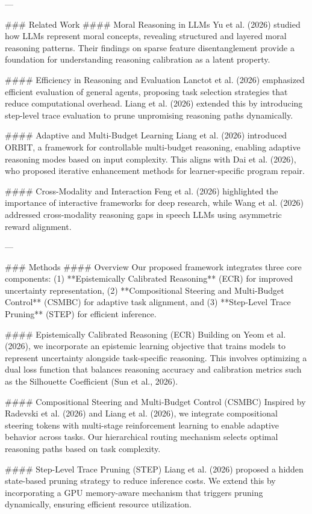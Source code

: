 ---

### Related Work
#### Moral Reasoning in LLMs
Yu et al. (2026) studied how LLMs represent moral concepts, revealing structured and layered moral reasoning patterns. Their findings on sparse feature disentanglement provide a foundation for understanding reasoning calibration as a latent property.

#### Efficiency in Reasoning and Evaluation
Lanctot et al. (2026) emphasized efficient evaluation of general agents, proposing task selection strategies that reduce computational overhead. Liang et al. (2026) extended this by introducing step-level trace evaluation to prune unpromising reasoning paths dynamically.

#### Adaptive and Multi-Budget Learning
Liang et al. (2026) introduced ORBIT, a framework for controllable multi-budget reasoning, enabling adaptive reasoning modes based on input complexity. This aligns with Dai et al. (2026), who proposed iterative enhancement methods for learner-specific program repair.

#### Cross-Modality and Interaction
Feng et al. (2026) highlighted the importance of interactive frameworks for deep research, while Wang et al. (2026) addressed cross-modality reasoning gaps in speech LLMs using asymmetric reward alignment.

---

### Methods
#### Overview
Our proposed framework integrates three core components: (1) **Epistemically Calibrated Reasoning** (ECR) for improved uncertainty representation, (2) **Compositional Steering and Multi-Budget Control** (CSMBC) for adaptive task alignment, and (3) **Step-Level Trace Pruning** (STEP) for efficient inference.

#### Epistemically Calibrated Reasoning (ECR)
Building on Yeom et al. (2026), we incorporate an epistemic learning objective that trains models to represent uncertainty alongside task-specific reasoning. This involves optimizing a dual loss function that balances reasoning accuracy and calibration metrics such as the Silhouette Coefficient (Sun et al., 2026).

#### Compositional Steering and Multi-Budget Control (CSMBC)
Inspired by Radevski et al. (2026) and Liang et al. (2026), we integrate compositional steering tokens with multi-stage reinforcement learning to enable adaptive behavior across tasks. Our hierarchical routing mechanism selects optimal reasoning paths based on task complexity.

#### Step-Level Trace Pruning (STEP)
Liang et al. (2026) proposed a hidden state-based pruning strategy to reduce inference costs. We extend this by incorporating a GPU memory-aware mechanism that triggers pruning dynamically, ensuring efficient resource utilization.

